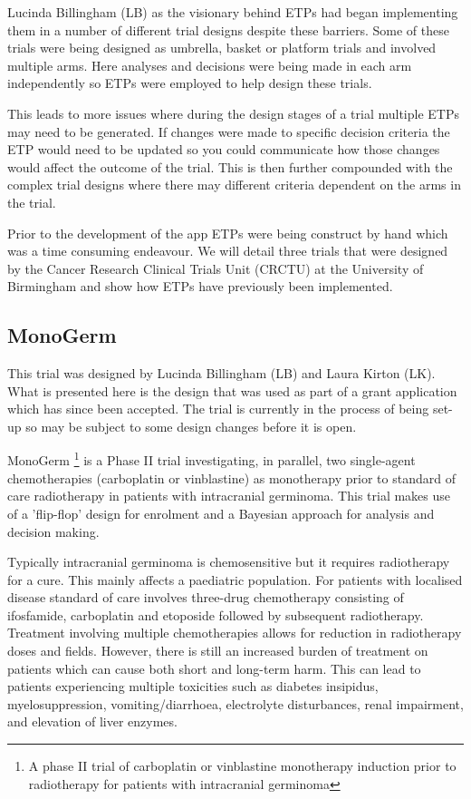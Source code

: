 Lucinda Billingham (LB) as the visionary behind ETPs had began implementing them in a number of different trial designs despite these barriers. Some of these trials were being designed as umbrella, basket or platform trials and involved multiple arms. Here analyses and decisions were being made in each arm independently so ETPs were employed to help design these trials. 

This leads to more issues where during the design stages of a trial multiple ETPs may need to be generated. If changes were made to specific decision criteria the ETP would need to be updated so you could communicate how those changes would affect the outcome of the trial. This is then further compounded with the complex trial designs where there may different criteria dependent on the arms in the trial.

Prior to the development of the app ETPs were being construct by hand which was a time consuming endeavour. We will detail three trials that were designed by the Cancer Research Clinical Trials Unit (CRCTU) at the University of Birmingham and show how ETPs have previously been implemented. 


\subsection{MonoGerm} 

This trial was designed by Lucinda Billingham (LB) and Laura Kirton (LK). What is presented here is the design that was used as part of a grant application which has since been accepted. The trial is currently in the process of being set-up so may be subject to some design changes before it is open. 

MonoGerm \footnote{A phase II trial of carboplatin or vinblastine monotherapy induction prior to radiotherapy for patients with intracranial germinoma} is a Phase \RN{2} trial investigating, in parallel, two single-agent chemotherapies (carboplatin or vinblastine) as monotherapy prior to standard of care radiotherapy in patients with intracranial germinoma. This trial makes use of a 'flip-flop' design for enrolment and a Bayesian approach for analysis and decision making. 

Typically intracranial germinoma is chemosensitive but it requires radiotherapy for a cure. This mainly affects a paediatric population. For patients with localised disease standard of care involves three-drug chemotherapy consisting of ifosfamide, carboplatin and etoposide followed by subsequent radiotherapy. Treatment involving multiple chemotherapies allows for reduction in radiotherapy doses and fields. However, there is still an increased burden of treatment on patients which can cause both short and long-term harm. This can lead to patients experiencing multiple toxicities such as diabetes insipidus, myelosuppression, vomiting/diarrhoea, electrolyte disturbances, renal impairment, and elevation of liver enzymes. 

